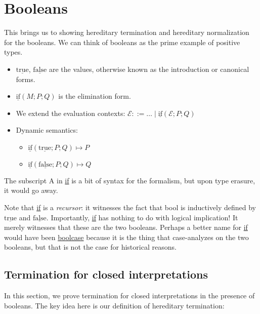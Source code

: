 \documentclass{article}
\newcommand{\hasEF}[3]{\ensuremath{#1 \vdash #2 : #3}}
\newcommand{\step}[2]{\ensuremath{#1 \mapsto #2}}
\newcommand{\booltype}{\text{bool}}
\newcommand{\E}{\mathcal{E}}
\newcommand{\true}{\ensuremath{\mathrm{\underline{true}}}}
\newcommand{\false}{\ensuremath{\mathrm{\underline{false}}}}
\newcommand{\ifexpr}[3]{\ensuremath{\mathrm{\underline{if}}(#1; #2; #3)}}
\newcommand{\ifexprtyp}[4]{\ensuremath{\mathrm{\underline{if}_#1}(#2; #3; #4)}}
\begin{document}
\section{Booleans}
This brings us to showing hereditary termination and hereditary normalization for the booleans. We can think of booleans as the prime example of positive types. 

\begin{itemize}
    \item \true{}, \false{} are the values, otherwise known as the introduction or canonical forms. 
    \item \ifexpr{M}{P}{Q} is the elimination form.
    \item We extend the evaluation contexts: $\E ::= \ldots \mid \ifexpr{\E}{P}{Q}$
    \item Dynamic semantics: 
    \begin{itemize}
		\item \step{\ifexpr{\true}{P}{Q}}{P}
		\item \step{\ifexpr{\false}{P}{Q}}{Q}
	\end{itemize}
\end{itemize}


The subscript A in \underline{if} is a bit of syntax for the formalism, but upon type erasure, it would go away.

Note that \underline{if} is a \textit{recursor}: it witnesses the fact that bool is inductively defined by \true{} and \false{}. Importantly, \underline{if} has nothing to do with logical implication! It merely witnesses that these are the two booleans. Perhaps a better name for \underline{if} would have been \underline{boolcase} because it is the thing that case-analyzes on the two booleans, but that is not the case for historical reasons.

\subsection{Termination for closed interpretations}
In this section, we prove termination for closed interpretations in the presence of booleans. The key idea here is our definition of hereditary termination:
\end{document}
